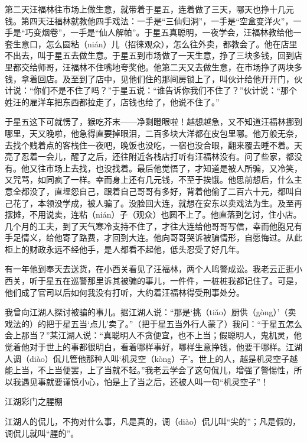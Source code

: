 \documentclass[12pt,UTF8]{ctexbook}
\begin{document}
第二天汪福林往市场上做生意，就带着于星五，连着做了三天，哪天也挣十几元钱。第四天汪福林就教他四手戏法：一手是“三仙归洞”，一手是“空盒变洋火”，一手是“巧变烟卷”，一手是“仙人解帕”。于星五真聪明，一夜学会，汪福林教给他一套生意口，怎么圆粘（nián）儿（招徕观众），怎么往外卖，都教会了。他在店里不出去，叫于星五去做生意。于星五到市场做了一天生意，挣了三块多钱，回到店里都交给师哥，汪福林不住嘴地夸奖他。他第二天又去做生意，在市场挣了两块多钱，拿着回店。及至到了店中，见他们住的那间房锁上了，叫伙计给他开开门，伙计说：“你们不是不住了吗？”于星五说：“谁告诉你我们不住了？”伙计说：“那个姓汪的雇洋车把东西都拉走了，店钱也给了，他说不住了。”

于星五这下可就愣了，猴吃芥末——净剩瞪眼啦！越想越急，又不知道汪福林挪到哪里，天又晚啦，他急得直要掉眼泪，二百多块大洋都在皮包里哪。他万般无奈，去找个贱着点的客栈住一夜吧，晚饭也没吃，一宿也没合眼，翻来覆去睡不着。天亮了忍着一会儿，醒了之后，还往附近各栈店打听有汪福林没有。问了些家，都没有。他又往市场上去找，也没找着。最后他觉悟了，才知道是被人所骗，又冷笑，又咒骂，如同疯了一样。幸而身上还有几元钱，不至于挨饿。他思前想后，什么主意全都没了，直埋怨自己，跟着自己哥哥有多好，背着他偷了二百六十元，都叫自己花了，本领没学成，被人骗了。没脸回大连，就想在安东以卖戏法为生。及至再摆摊，不用说卖，连粘（nián）子（观众）也圆不上了。他直落到乞讨，住小店。几个月的工夫，到了天气寒冷支持不住了，才往大连给他哥哥写信，幸而他胞兄有手足情义，给他寄了路费，才回到大连。他向哥哥哭诉被骗情形，自愿悔过。从此柜上的财政永远不经他手，是人都看不起他，低头忍受了好几年。

有一年他到奉天去送货，在小西关看见了汪福林，两个人鸣警成讼。我老云正逛小西关，听于星五在巡警那里诉其被骗的事儿，一件件，一桩桩我都记住了。可是，他们成了官司以后如何我没有打听，大约着汪福林得受刑事处分。

我曾向江湖人探讨被骗的事儿。据江湖人说：“那是‘挑（tiǎo）厨供（gòng）’（卖戏法的）的把于星五当‘点儿’卖了。”（把于星五当外行人蒙了）我问：“于星五怎么会上那当？”某江湖人说：“真聪明人不贪便宜，也不上当；假聪明人，鬼机灵，他觉着他对于世上的事都很明白，看着哪样事好，哪样生意挣钱，他要干哪样。江湖人调（diào）侃儿管他那种人叫‘机灵空（kòng）子’。世上的人，越是机灵空子越能上当，不上当便罢，上了当就不轻。”我老云学会了这句侃儿，增强了警惕性，所以我遇见事就要谨慎小心，怕是上了当之后，还被人叫一句“机灵空子”！





江湖彩门之腥棚


江湖人的侃儿，不拘对什么事，凡是真的，调（diào）侃儿叫“尖的”；凡是假的，调侃儿就叫“腥的”。
\end{document}
